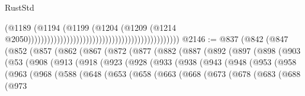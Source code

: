 \begin{lexlean}{RustStd}
\begin{coremodule}
                                                                                      (@1189
                                                                                        (@1194
                                                                                          (@1199
                                                                                            (@1204
                                                                                              (@1209
                                                                                                (@1214
                                                                                                  @2050)))))))))))))))))))))))))))))))))))))))))))))))
@2146 := @837
    (@842
      (@847
        (@852
          (@857
            (@862
              (@867
                (@872
                  (@877
                    (@882
                      (@887
                        (@892
                          (@897
                            (@898
                              (@903
                                (@53
                                  (@908
                                    (@913
                                      (@918
                                        (@923
                                          (@928
                                            (@933
                                              (@938
                                                (@943
                                                  (@948
                                                    (@953
                                                      (@958
                                                        (@963
                                                          (@968
                                                            (@588
                                                              (@648
                                                                (@653
                                                                  (@658
                                                                    (@663
                                                                      (@668
                                                                        (@673
                                                                          (@678
                                                                            (@683
                                                                              (@688
                                                                                (@973

\end{coremodule}
\end{lexlean}
